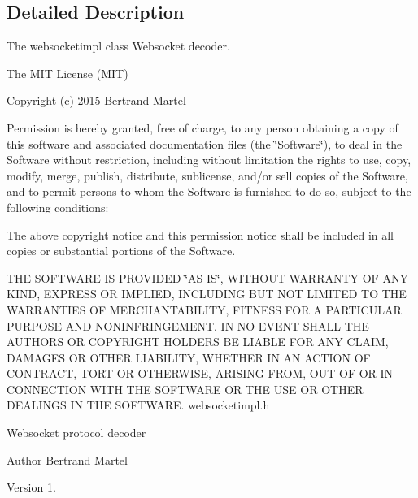 \subsection{Detailed Description}
The websocketimpl class Websocket decoder. 

The M\-I\-T License (M\-I\-T)

Copyright (c) 2015 Bertrand Martel

Permission is hereby granted, free of charge, to any person obtaining a copy of this software and associated documentation files (the \char`\"{}\-Software\char`\"{}), to deal in the Software without restriction, including without limitation the rights to use, copy, modify, merge, publish, distribute, sublicense, and/or sell copies of the Software, and to permit persons to whom the Software is furnished to do so, subject to the following conditions\-:

The above copyright notice and this permission notice shall be included in all copies or substantial portions of the Software.

T\-H\-E S\-O\-F\-T\-W\-A\-R\-E I\-S P\-R\-O\-V\-I\-D\-E\-D \char`\"{}\-A\-S I\-S\char`\"{}, W\-I\-T\-H\-O\-U\-T W\-A\-R\-R\-A\-N\-T\-Y O\-F A\-N\-Y K\-I\-N\-D, E\-X\-P\-R\-E\-S\-S O\-R I\-M\-P\-L\-I\-E\-D, I\-N\-C\-L\-U\-D\-I\-N\-G B\-U\-T N\-O\-T L\-I\-M\-I\-T\-E\-D T\-O T\-H\-E W\-A\-R\-R\-A\-N\-T\-I\-E\-S O\-F M\-E\-R\-C\-H\-A\-N\-T\-A\-B\-I\-L\-I\-T\-Y, F\-I\-T\-N\-E\-S\-S F\-O\-R A P\-A\-R\-T\-I\-C\-U\-L\-A\-R P\-U\-R\-P\-O\-S\-E A\-N\-D N\-O\-N\-I\-N\-F\-R\-I\-N\-G\-E\-M\-E\-N\-T. I\-N N\-O E\-V\-E\-N\-T S\-H\-A\-L\-L T\-H\-E A\-U\-T\-H\-O\-R\-S O\-R C\-O\-P\-Y\-R\-I\-G\-H\-T H\-O\-L\-D\-E\-R\-S B\-E L\-I\-A\-B\-L\-E F\-O\-R A\-N\-Y C\-L\-A\-I\-M, D\-A\-M\-A\-G\-E\-S O\-R O\-T\-H\-E\-R L\-I\-A\-B\-I\-L\-I\-T\-Y, W\-H\-E\-T\-H\-E\-R I\-N A\-N A\-C\-T\-I\-O\-N O\-F C\-O\-N\-T\-R\-A\-C\-T, T\-O\-R\-T O\-R O\-T\-H\-E\-R\-W\-I\-S\-E, A\-R\-I\-S\-I\-N\-G F\-R\-O\-M, O\-U\-T O\-F O\-R I\-N C\-O\-N\-N\-E\-C\-T\-I\-O\-N W\-I\-T\-H T\-H\-E S\-O\-F\-T\-W\-A\-R\-E O\-R T\-H\-E U\-S\-E O\-R O\-T\-H\-E\-R D\-E\-A\-L\-I\-N\-G\-S I\-N T\-H\-E S\-O\-F\-T\-W\-A\-R\-E. websocketimpl.\-h

Websocket protocol decoder

\begin{DoxyAuthor}{Author}
Bertrand Martel 
\end{DoxyAuthor}
\begin{DoxyVersion}{Version}
1. 
\end{DoxyVersion}


